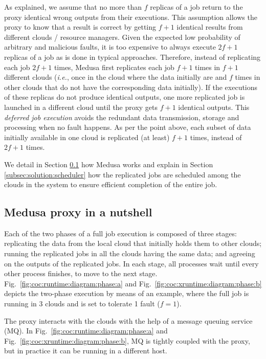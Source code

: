 \documentclass[10pt, conference, compsocconf]{IEEEtran}
\begin{document}
As explained, we assume that no more than $f$ replicas of a job return to the proxy identical wrong outputs from their executions. This assumption allows the proxy to know that a result is correct by getting $f+1$ identical results from different clouds / resource managers.
Given the expected low probability of arbitrary and malicious faults, it is too expensive to always execute $2f+1$ replicas of a job as is done in typical approaches.
Therefore, instead of replicating each job $2f+1$ times, Medusa first replicates each job $f+1$ times in
$f+1$ different clouds (\textit{i.e.}, once in the cloud where the data initially are and $f$ times in other clouds that do not have the corresponding data initially). If the executions of these replicas do not produce identical outputs, one more replicated job is launched in a different cloud until the proxy gets $f+1$ identical outputs. This \emph{deferred job execution} avoids the redundant data transmission, storage and processing when no fault happens.
As per the point above, each subset of data initially available in one cloud is replicated (at least) $f+1$ times, instead of $2f+1$ times.

We detail in Section \ref{subsec:solution:example} how Medusa works and explain in Section \ref{subsec:solution:scheduler} how the replicated jobs are scheduled among the clouds in the system to ensure efficient completion of the entire job.

\subsection{Medusa proxy in a nutshell}
\label{subsec:solution:example}

Each of the two phases of a full job execution is composed of three stages: replicating the data from the local cloud that initially holds them to other clouds; running the replicated jobs in all the clouds having the same data; and agreeing on the outputs of the replicated jobs. In each stage, all processes wait until every other process finishes, to move to the next stage. Fig.~\ref{fig:coc:runtime:diagram:phase:a} and Fig.~\ref{fig:coc:xruntime:diagram:phase:b} depicts the two-phase execution by means of an example, where the full job is running in 3 clouds and is set to tolerate 1 fault ($f=1$).

The proxy interacts with the clouds with the help of a message queuing service (MQ).
In Fig.~\ref{fig:coc:runtime:diagram:phase:a} and Fig.~\ref{fig:coc:xruntime:diagram:phase:b}, MQ is tightly coupled with the proxy, but in practice it can be running in a different host.
\end{document}
